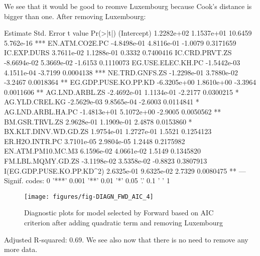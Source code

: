 \documentclass[a4paper]{article}
\begin{document}
We see that it would be good to reomve Luxembourg because Cook's distance is bigger
than one. After removing Luxembourg:
		

\begin{Schunk}
\begin{Soutput}
                             Estimate  Std. Error t value  Pr(>|t|)    
(Intercept)                1.2282e+02  1.1537e+01 10.6459 5.762e-16 ***
EN.ATM.CO2E.PC            -4.8498e-01  4.8116e-01 -1.0079 0.3171659    
IC.EXP.DURS                3.7611e-02  1.1288e-01  0.3332 0.7400416    
IC.CRD.PRVT.ZS            -8.6694e-02  5.3669e-02 -1.6153 0.1110073    
EG.USE.ELEC.KH.PC         -1.5442e-03  4.1511e-04 -3.7199 0.0004138 ***
NE.TRD.GNFS.ZS            -1.2298e-01  3.7880e-02 -3.2467 0.0018364 ** 
EG.GDP.PUSE.KO.PP.KD      -6.3205e+00  1.8610e+00 -3.3964 0.0011606 ** 
AG.LND.ARBL.ZS            -2.4692e-01  1.1134e-01 -2.2177 0.0300215 *  
AG.YLD.CREL.KG            -2.5629e-03  9.8565e-04 -2.6003 0.0114841 *  
AG.LND.ARBL.HA.PC         -1.4813e+01  5.1072e+00 -2.9005 0.0050562 ** 
BM.GSR.TRVL.ZS             2.9628e-01  1.1909e-01  2.4878 0.0153860 *  
BX.KLT.DINV.WD.GD.ZS       1.9754e-01  1.2727e-01  1.5521 0.1254123    
ER.H2O.INTR.PC             3.7101e-05  2.9804e-05  1.2448 0.2175982    
EN.ATM.PM10.MC.M3          6.1596e-02  4.0661e-02  1.5149 0.1345820    
FM.LBL.MQMY.GD.ZS         -3.1198e-02  3.5358e-02 -0.8823 0.3807913    
I(EG.GDP.PUSE.KO.PP.KD^2)  2.6325e-01  9.6325e-02  2.7329 0.0080475 ** 
---
Signif. codes:  0 '***' 0.001 '**' 0.01 '*' 0.05 '.' 0.1 ' ' 1
\end{Soutput}
\end{Schunk}
		
\begin{figure}[H]
\begin{center}
\texttt{[image: figures/fig-DIAGN\_FWD\_AIC\_4]}
\caption{Diagnostic plots for model selected by Forward based on AIC criterion
after adding quadratic term and removing Luxembourg}
\end{center}
\end{figure}
Adjusted R-squared:
0.69. We see also now
that there is no need to remove any more data.
\end{document}
